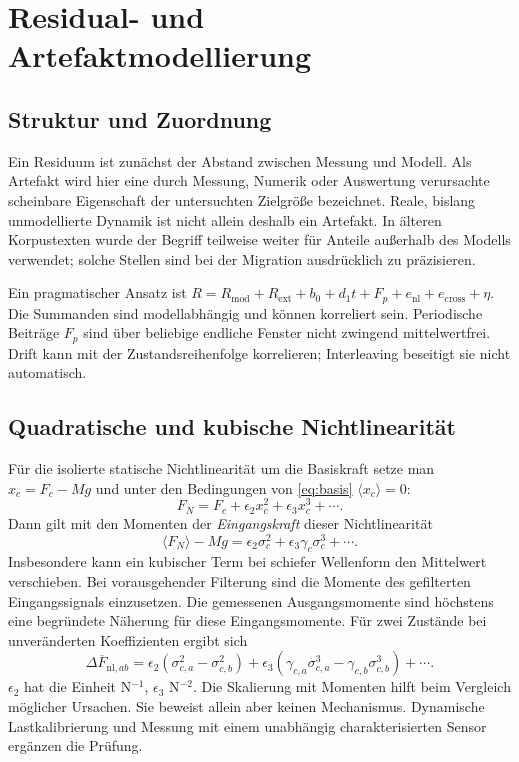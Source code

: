 \documentclass[11pt,a4paper]{article}
\begin{document}
\section{Residual- und Artefaktmodellierung}\label{sec:residual}
\subsection{Struktur und Zuordnung}
Ein Residuum ist zunächst der Abstand zwischen Messung und Modell. Als Artefakt wird hier eine durch Messung, Numerik oder Auswertung verursachte scheinbare Eigenschaft der untersuchten Zielgröße bezeichnet. Reale, bislang unmodellierte Dynamik ist nicht allein deshalb ein Artefakt. In älteren Korpustexten wurde der Begriff teilweise weiter für Anteile außerhalb des Modells verwendet; solche Stellen sind bei der Migration ausdrücklich zu präzisieren.

Ein pragmatischer Ansatz ist $R=R_{\mathrm{mod}}+R_{\mathrm{ext}}+b_0+d_1t+F_p+e_{\mathrm{nl}}+e_{\mathrm{cross}}+\eta$. Die Summanden sind modellabhängig und können korreliert sein. Periodische Beiträge $F_p$ sind über beliebige endliche Fenster nicht zwingend mittelwertfrei. Drift kann mit der Zustandsreihenfolge korrelieren; Interleaving beseitigt sie nicht automatisch.

\subsection{Quadratische und kubische Nichtlinearität}\label{sec:gleichrichtung}
Für die isolierte statische Nichtlinearität um die Basiskraft setze man $x_c=F_c-Mg$ und unter den Bedingungen von \eqref{eq:basis} $\langle x_c\rangle=0$:
\begin{equation}
F_N=F_c+\epsilon_2 x_c^2+\epsilon_3 x_c^3+\cdots.
\end{equation}
Dann gilt mit den Momenten der \emph{Eingangskraft} dieser Nichtlinearität
\begin{equation}
\langle F_N\rangle-Mg=\epsilon_2\sigma_c^2+\epsilon_3\gamma_c\sigma_c^3+\cdots.
\label{eq:gleichrichtung}
\end{equation}
Insbesondere kann ein kubischer Term bei schiefer Wellenform den Mittelwert verschieben. Bei vorausgehender Filterung sind die Momente des gefilterten Eingangssignals einzusetzen. Die gemessenen Ausgangsmomente sind höchstens eine begründete Näherung für diese Eingangsmomente.
Für zwei Zustände bei unveränderten Koeffizienten ergibt sich
\begin{equation}
\Delta\overline F_{\mathrm{nl},ab}=\epsilon_2(\sigma_{c,a}^2-\sigma_{c,b}^2)
+\epsilon_3(\gamma_{c,a}\sigma_{c,a}^3-\gamma_{c,b}\sigma_{c,b}^3)+\cdots.
\end{equation}
$\epsilon_2$ hat die Einheit N$^{-1}$, $\epsilon_3$ N$^{-2}$. Die Skalierung mit Momenten hilft beim Vergleich möglicher Ursachen. Sie beweist allein aber keinen Mechanismus. Dynamische Lastkalibrierung und Messung mit einem unabhängig charakterisierten Sensor ergänzen die Prüfung.
\end{document}
